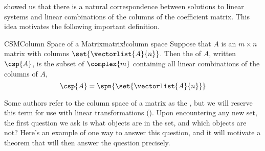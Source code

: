 %
 showed us that there is a natural correspondence between solutions to linear systems and linear combinations of the columns of the coefficient matrix.  This idea motivates the following important definition.
%
\begin{definition}{CSM}{Column Space of a Matrix}{matrix!column space}
Suppose that $A$ is an $m\times n$ matrix with columns $\set{\vectorlist{A}{n}}$.  Then the  of $A$, written $\csp{A}$, is the subset of $\complex{m}$ containing all linear combinations of the columns of $A$,
%
\begin{equation*}
\csp{A}=\spn{\set{\vectorlist{A}{n}}}
\end{equation*}
%
\end{definition}
%
Some authors refer to the column space of a matrix as the , but we will reserve this term for use with linear transformations ().
%
%
Upon encountering any new set, the first question we ask is what objects are in the set, and which objects are not?  Here's an example of one way to answer this question, and it will motivate a theorem that will then answer the question precisely.
%
